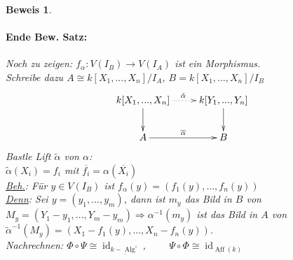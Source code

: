 \documentclass[a4paper,12pt]{report}
\theoremstyle{break}
\theoremstyle{nonumberbreak}
\newtheorem{Bew}{Beweis}
\theoremstyle{nonumberplain}
\begin{document}
\begin{Bew}
\paragraph{Ende Bew. Satz:}
Noch zu zeigen: $f_{\alpha}: V(I_B) \rightarrow V(I_A)$ ist ein Morphismus.\\
Schreibe dazu $A\cong k[X_1,...,X_n]/I_A$, $B=k[X_1,...,X_n]/I_B$
\[
\begin{xy}
\xymatrix{
k[X_1,...,X_n]\ar@{.>}[r]^{\tilde{\alpha}}\ar[d]&k[Y_1,...,Y_n]\ar[d] \\
A\ar[r]^{\overline{\alpha}}&B
}
\end{xy}
\]
Bastle Lift $\tilde{\alpha}$ von $\alpha$:\\
$\tilde{\alpha}(X_i)=f_i$ mit $\overline{f_i}=\alpha(\overline{X_i})$\\
\underline{Beh.}: Für $y\in V(I_B)$ ist $f_{\alpha}(y)=(f_1(y),...,f_n(y))$\\
\underline{Denn}: Sei $y=(y_1,...,y_m)$, dann ist $m_y$ das Bild in $B$ von $M_y=(Y_1-y_1,...,Y_m-y_m)\Rightarrow \alpha^{-1}(m_y)$ ist das Bild in $A$ von $\tilde{\alpha}^{-1}(M_y)= (X_1-f_1(y),...,X_n-f_n(y))$.\\
Nachrechnen: $\Phi\circ\Psi\cong\operatorname{id}_{\underline{k-\operatorname{Alg}^{\circ}}}$, ~~~~$\Psi\circ\Phi\cong\operatorname{id}_{\underline{\operatorname{Aff}}(k)}$
\end{Bew}
\end{document}

